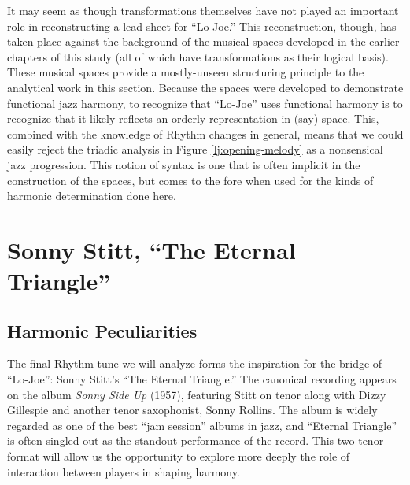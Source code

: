 It may seem as though transformations themselves have not played an important
role in reconstructing a lead sheet for ``Lo-Joe.'' This reconstruction,
though, has taken place against the background of the musical spaces developed
in the earlier chapters of this study (all of which have transformations as
their logical basis). These musical spaces provide a mostly-unseen structuring
principle to the analytical work in this section. Because the spaces were
developed to demonstrate functional jazz harmony, to recognize that ``Lo-Joe''
uses functional harmony is to recognize that it likely reflects an orderly
representation in (say) \tf space. This, combined with the knowledge of Rhythm
changes in general, means that we could easily reject the triadic analysis in
Figure \ref{lj:opening-melody} as a nonsensical jazz progression. This notion
of syntax is one that is often implicit in the construction of the spaces, but
comes to the fore when used for the kinds of harmonic determination done
here.

\newcommand{\comment}[1]{\clearpage\noindent[``Eternal Triangle'' analysis
  goes here \ldots\ uncomment it later!]}
\section{Sonny Stitt, “The Eternal Triangle”}
\label{sec:eternal-triangle}

\subsection{Harmonic Peculiarities}

The final Rhythm tune we will analyze forms the inspiration for the bridge of
``Lo-Joe'': Sonny Stitt's ``The Eternal Triangle.'' The
canonical recording appears on the album \emph{Sonny Side Up} (1957),
featuring Stitt on tenor along with Dizzy Gillespie and another tenor
saxophonist, Sonny Rollins.\nocite{gillespie:sonnyside} The album is widely
regarded as one of the best ``jam session'' albums in jazz, and ``Eternal
Triangle'' is often singled out as the standout performance of the
record. This two-tenor format will allow us the opportunity to
explore more deeply the role of interaction between players in shaping
harmony.

